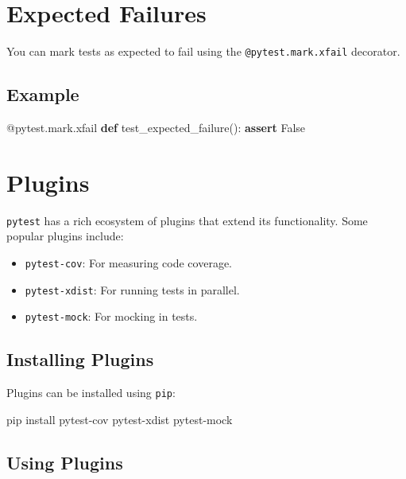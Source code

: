 \documentclass[
  letterpaper,
  DIV=11,
  numbers=noendperiod]{scrreprt}
\newenvironment{Shaded}{\begin{snugshade}}{\end{snugshade}}
\newcommand{\AttributeTok}[1]{\textcolor[rgb]{0.40,0.45,0.13}{#1}}
\newcommand{\ControlFlowTok}[1]{\textcolor[rgb]{0.00,0.23,0.31}{\textbf{#1}}}
\newcommand{\ExtensionTok}[1]{\textcolor[rgb]{0.00,0.23,0.31}{#1}}
\newcommand{\KeywordTok}[1]{\textcolor[rgb]{0.00,0.23,0.31}{\textbf{#1}}}
\newcommand{\NormalTok}[1]{\textcolor[rgb]{0.00,0.23,0.31}{#1}}
\newcommand{\VariableTok}[1]{\textcolor[rgb]{0.07,0.07,0.07}{#1}}
\providecommand{\tightlist}{%
  \setlength{\itemsep}{0pt}\setlength{\parskip}{0pt}}\usepackage{longtable,booktabs,array}
\begin{document}
\section{Expected Failures}\label{expected-failures-1}

You can mark tests as expected to fail using the
\texttt{@pytest.mark.xfail} decorator.

\subsection{Example}\label{example-24}

\begin{Shaded}
\begin{Highlighting}[]
\AttributeTok{@pytest.mark.xfail}
\KeywordTok{def}\NormalTok{ test\_expected\_failure():}
    \ControlFlowTok{assert} \VariableTok{False}
\end{Highlighting}
\end{Shaded}

\section{Plugins}\label{plugins}

\texttt{pytest} has a rich ecosystem of plugins that extend its
functionality. Some popular plugins include:

\begin{itemize}
\tightlist
\item
  \texttt{pytest-cov}: For measuring code coverage.
\item
  \texttt{pytest-xdist}: For running tests in parallel.
\item
  \texttt{pytest-mock}: For mocking in tests.
\end{itemize}

\subsection{Installing Plugins}\label{installing-plugins}

Plugins can be installed using \texttt{pip}:

\begin{Shaded}
\begin{Highlighting}[]
\ExtensionTok{pip}\NormalTok{ install pytest{-}cov pytest{-}xdist pytest{-}mock}
\end{Highlighting}
\end{Shaded}

\subsection{Using Plugins}\label{using-plugins}
\end{document}
